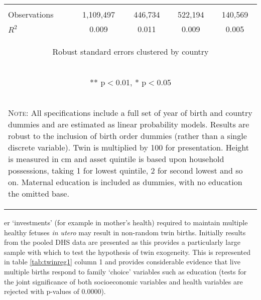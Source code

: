 \documentclass{article}[11pt,subeqn]
\begin{document}
\begin{spacing}{1.5}
\begin{table}[htpb!]
\begin{center}
\begin{tabular}{lcccc}
\vspace{4pt} & \begin{footnotesize}\end{footnotesize} & \begin{footnotesize}\end{footnotesize} & \begin{footnotesize}\end{footnotesize} & \begin{footnotesize}\end{footnotesize} \\
Observations & 1,109,497 & 446,734 & 522,194 & 140,569 \\
 $R^2$ & 0.009 & 0.011 & 0.009 & 0.005 \\ \midrule
\multicolumn{5}{c}{\begin{footnotesize} Robust standard errors clustered by country \end{footnotesize}} \\
\multicolumn{5}{c}{\begin{footnotesize} ** p$<$0.01, * p$<$0.05 \end{footnotesize}} \\
\bottomrule
\multicolumn{5}{p{10cm}}{\setstretch{0.9}\begin{footnotesize}\textsc{Note:} All specifications include a full set of year of birth and country
dummies and are estimated as linear probability models.  Results are robust to the inclusion of birth order dummies (rather than a single discrete 
variable).  Twin is multiplied by 100 for presentation.  Height is measured in cm and asset quintile is based upon household possessions, taking 1 
for lowest quintile, 2 for second lowest and so on.  Maternal education is included as dummies, with no education the omitted base.\end{footnotesize}}\\
\end{tabular}
\end{center}
\end{table}


\noindent er `investments' (for example in mother's health) required to maintain multiple healthy fetuses \emph{in utero} may result in 
non-random twin births. Initially results from the pooled DHS data are presented as this provides a particularly large sample with which to test the hypothesis of
twin exogeneity.  This is represented in table \ref{tab:twinreg1} column 1 and provides considerable evidence that live multiple
births respond to family `choice' variables such as education (tests for the joint significance of both socioeconomic variables and health
variables are rejected with p-values of 0.0000).


\end{spacing}
\end{document}
